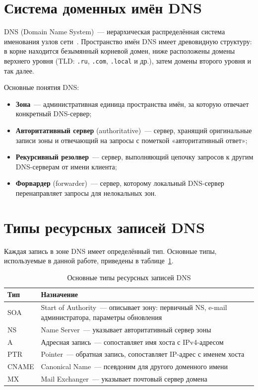 \documentclass[a4paper,14pt,oneside,openany]{memoir}
\begin{document}
\section{Система доменных имён DNS}

DNS (Domain Name System)~--- иерархическая распределённая система именования узлов сети~\cite{rfc1034}. Пространство имён DNS имеет древовидную структуру: в корне находится безымянный корневой домен, ниже расположены домены верхнего уровня (TLD: \texttt{.ru}, \texttt{.com}, \texttt{.local} и др.), затем домены второго уровня и так далее.

Основные понятия DNS:
\begin{itemize}
    \item \textbf{Зона}~--- административная единица пространства имён, за которую отвечает конкретный DNS-сервер;
    \item \textbf{Авторитативный сервер} (authoritative)~--- сервер, хранящий оригинальные записи зоны и отвечающий на запросы с пометкой «авторитативный ответ»;
    \item \textbf{Рекурсивный резолвер}~--- сервер, выполняющий цепочку запросов к другим DNS-серверам от имени клиента;
    \item \textbf{Форвардер} (forwarder)~--- сервер, которому локальный DNS-сервер перенаправляет запросы для нелокальных зон.
\end{itemize}

\section{Типы ресурсных записей DNS}

Каждая запись в зоне DNS имеет определённый тип. Основные типы, используемые в данной работе, приведены в таблице~\ref{tab:rr}.

\begin{table}[h]
    \caption{Основные типы ресурсных записей DNS}
    \label{tab:rr}
    \begin{tabular}{|l|p{10cm}|}
        \hline
        \textbf{Тип} & \textbf{Назначение} \\
        \hline
        SOA   & Start of Authority~--- описывает зону: первичный NS, e-mail администратора, параметры обновления \\
        \hline
        NS    & Name Server~--- указывает авторитативный сервер зоны \\
        \hline
        A     & Адресная запись~--- сопоставляет имя хоста с IPv4-адресом \\
        \hline
        PTR   & Pointer~--- обратная запись, сопоставляет IP-адрес с именем хоста \\
        \hline
        CNAME & Canonical Name~--- псевдоним для другого доменного имени \\
        \hline
        MX    & Mail Exchanger~--- указывает почтовый сервер домена \\
        \hline
    \end{tabular}
\end{table}
\end{document}
